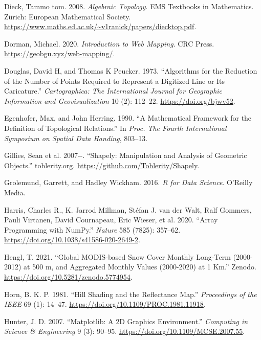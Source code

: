 \documentclass[
  letterpaper,
]{krantz}
\newlength{\cslhangindent}
\newenvironment{CSLReferences}[2] %
 {\begin{list}{}{%
  \setlength{\itemindent}{0pt}
  \setlength{\leftmargin}{0pt}
  \setlength{\parsep}{0pt}
  \ifodd #1
   \setlength{\leftmargin}{\cslhangindent}
   \setlength{\itemindent}{-1\cslhangindent}
  \fi
  \setlength{\itemsep}{#2\baselineskip}}}
 {\end{list}}
\begin{document}
\begin{CSLReferences}{1}{0}
Dieck, Tammo tom. 2008. \emph{Algebraic Topology}. {EMS} Textbooks in
Mathematics. {Zürich}: {European Mathematical Society}.
\url{https://www.maths.ed.ac.uk/~v1ranick/papers/diecktop.pdf}.

Dorman, Michael. 2020. \emph{Introduction to Web Mapping}. CRC Press.
\url{https://geobgu.xyz/web-mapping/}.

Douglas, David H, and Thomas K Peucker. 1973. {``Algorithms for the
Reduction of the Number of Points Required to Represent a Digitized Line
or Its Caricature.''} \emph{Cartographica: The International Journal for
Geographic Information and Geovisualization} 10 (2): 112--22.
\url{https://doi.org/bjwv52}.

Egenhofer, Max, and John Herring. 1990. {``A Mathematical Framework for
the Definition of Topological Relations.''} In \emph{Proc. The Fourth
International Symposium on Spatial Data Handing}, 803--13.

Gillies, Sean et al. 2007-\/-. {``Shapely: Manipulation and Analysis of
Geometric Objects.''} toblerity.org.
\url{https://github.com/Toblerity/Shapely}.

Grolemund, Garrett, and Hadley Wickham. 2016. \emph{R for {Data
Science}}. {O'Reilly Media}.

Harris, Charles R., K. Jarrod Millman, Stéfan J. van der Walt, Ralf
Gommers, Pauli Virtanen, David Cournapeau, Eric Wieser, et al. 2020.
{``Array Programming with {NumPy}.''} \emph{Nature} 585 (7825): 357--62.
\url{https://doi.org/10.1038/s41586-020-2649-2}.

Hengl, T. 2021. {``Global {MODIS-based} Snow Cover Monthly Long-Term
(2000-2012) at 500 m, and Aggregated Monthly Values (2000-2020) at 1
Km.''} {Zenodo}. \url{https://doi.org/10.5281/zenodo.5774954}.

Horn, B. K. P. 1981. {``Hill Shading and the Reflectance Map.''}
\emph{Proceedings of the IEEE} 69 (1): 14--47.
\url{https://doi.org/10.1109/PROC.1981.11918}.

Hunter, J. D. 2007. {``Matplotlib: A 2D Graphics Environment.''}
\emph{Computing in Science \& Engineering} 9 (3): 90--95.
\url{https://doi.org/10.1109/MCSE.2007.55}.


\end{CSLReferences}
\end{document}
